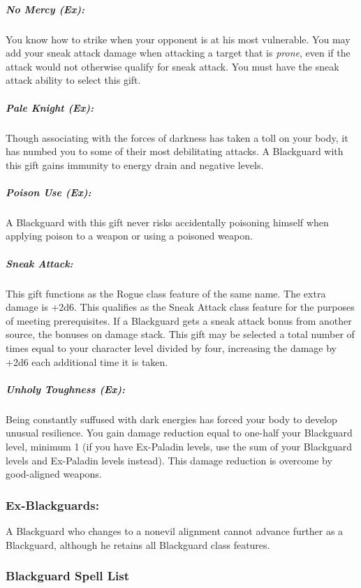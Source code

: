 \subparagraph{No Mercy (Ex):}
You know how to strike when your opponent is at his most vulnerable. You may add your sneak attack damage when attacking a target that is \emph{prone}, even if the attack would not otherwise qualify for sneak attack. You must have the sneak attack ability to select this gift.

\subparagraph{Pale Knight (Ex):}
Though associating with the forces of darkness has taken a toll on your body, it has numbed you to some of their most debilitating attacks. A Blackguard with this gift gains immunity to energy drain and negative levels. 

\subparagraph{Poison Use (Ex):}
A Blackguard with this gift never risks accidentally poisoning himself when applying poison to a weapon or using a poisoned weapon.

\subparagraph{Sneak Attack:}
This gift functions as the Rogue class feature of the same name. 
The extra damage is +2d6. 
This qualifies as the Sneak Attack class feature for the purposes of meeting prerequisites.
If a Blackguard gets a sneak attack bonus from another source, the bonuses on damage stack.
This gift may be selected a total number of times equal to your character level divided by four, increasing the damage by +2d6 each additional time it is taken.

\subparagraph{Unholy Toughness (Ex):}
Being constantly suffused with dark energies has forced your body to develop unusual resilience. You gain damage reduction equal to one-half your Blackguard level, minimum 1 (if you have Ex-Paladin levels, use the sum of your Blackguard levels and Ex-Paladin levels instead). This damage reduction is overcome by good-aligned weapons.

\subsubsection{Ex-Blackguards:}
A Blackguard who changes to a nonevil alignment cannot advance further as a Blackguard, although he retains all Blackguard class features.

\subsubsection{Blackguard Spell List}
